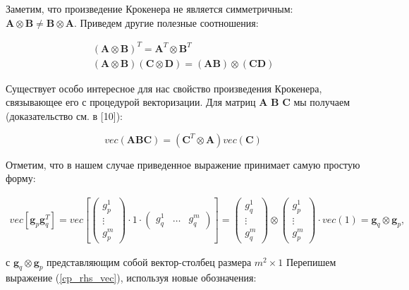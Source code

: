 Заметим, что произведение Крокенера не является симметричным: $\mathbf{A} \otimes \mathbf{B} \neq \mathbf{B} \otimes \mathbf{A}$. Приведем другие полезные соотношения:

\begin{gather}
    (\mathbf{A} \otimes \mathbf{B})^T = \mathbf{A}^T \otimes \mathbf{B}^T \\
    (\mathbf{A} \otimes \mathbf{B}) (\mathbf{C} \otimes \mathbf{D}) = (\mathbf{A} \mathbf{B}) \otimes (\mathbf{C} \mathbf{D})
\end{gather}

Существует особо интересное для нас свойство произведения Крокенера, связывающее его с процедурой векторизации. Для матриц $\mathbf{A}$ $\mathbf{B}$ $\mathbf{C}$ мы получаем (доказательство см. в [10]):

\begin{equation}
    vec(\mathbf{A} \mathbf{B} \mathbf{C}) = (\mathbf{C}^T \otimes \mathbf{A}) vec(\mathbf{C}) 
\end{equation}

Отметим, что в нашем случае приведенное выражение принимает самую простую форму:

\begin{gather}
    vec[\mathbf{g}_p \mathbf{g}_q^T] = vec\left[
        \begin{pmatrix}
            g_p^1 \\
            \vdots \\
            g_p^m
        \end{pmatrix}
    \cdot 1 \cdot
    \begin{pmatrix}
        g_q^1 & \dots & g_q^m
    \end{pmatrix}
    \right] = %
    \begin{pmatrix}
        g_q^1 \\
        \vdots \\
        g_q^m
    \end{pmatrix}   
    \otimes
    \begin{pmatrix}
        g_p^1 \\
        \vdots \\
        g_p^m
    \end{pmatrix}
    \cdot
    vec(1) =
    \mathbf{g}_q \otimes \mathbf{g}_p,
\end{gather}

с $\mathbf{g}_q \otimes \mathbf{g}_p$ представляющим собой вектор-столбец размера $m^2 \times 1$
Перепишем выражение (\ref{cp_rhs_vec}), используя новые обозначения:

